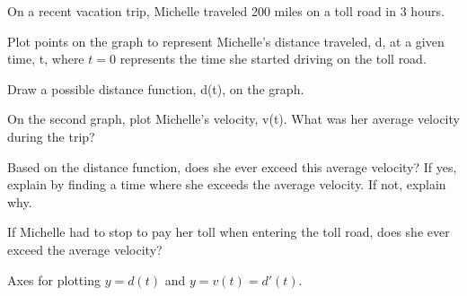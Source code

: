 \begin{pa} \label{PA:3.5}
On a recent vacation trip, Michelle traveled 200 miles on a toll road in 3 hours. 
\ba
	\item Plot points on the graph to represent Michelle's distance traveled, d, at a given time, t, where $t=0$ represents the time she started driving on the toll road.  
	\item Draw a possible distance function, d(t), on the graph.  
	\item On the second graph, plot Michelle's velocity, v(t). What was her average velocity during the trip?
	\item Based on the distance function, does she ever exceed this average velocity? If yes, explain by finding a time where she exceeds the average velocity. If not, explain why.
	\item If Michelle had to stop to pay her toll when entering the toll road, does she ever exceed the average velocity?
\ea
\end{pa} 
\afterpa

\begin{marginfigure}[-1.75cm]

\caption{Axes for plotting $y = d(t)$ and $y=v(t)=d'(t)$.} \label{fig:3.5.PA1}
\end{marginfigure}